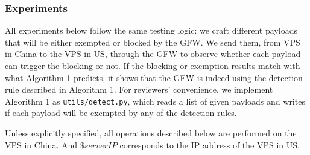 \subsubsection{Experiments}
All experiments below follow the same testing logic:
we craft different payloads that will be either exempted or blocked by the GFW.
We send them, from VPS in China to the VPS in US, through the GFW 
to observe whether each payload can trigger the blocking or not.
If the blocking or exemption results match with
what Algorithm 1 predicts,
it shows that the GFW is indeed using the detection rule described in Algorithm 1.
%
For reviewers' convenience, we implement Algorithm 1 as \texttt{utils/detect.py},
which reads a list of given payloads and 
writes if each payload will be exempted by any of the detection rules.

Unless explicitly specified, 
all operations described below are performed on the VPS in China.
And $\$serverIP$ corresponds to the IP address of the VPS in US.

